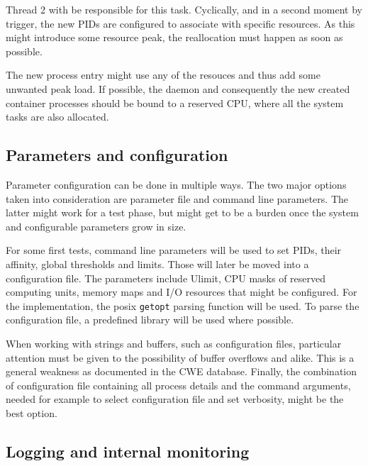 \documentclass[]{scrartcl}
\begin{document}
Thread 2 with be responsible for this task. Cyclically, and in a second moment by trigger, the new PIDs are configured to associate with specific resources.
As this might introduce some resource peak, the reallocation must happen as soon as possible. 

The new process entry might use any of the resouces and thus add some unwanted peak load. 
If possible, the daemon and consequently the new created container processes should be bound to a reserved {CPU}, where all the system tasks are also allocated.

\subsection{Parameters and configuration}

Parameter configuration can be done in multiple ways. The two major options taken into consideration are parameter file and command line parameters.
The latter might work for a test phase, but might get to be a burden once the system and configurable parameters grow in size.

For some first tests, command line parameters will be used to set PIDs, their affinity, global thresholds and limits.
Those will later be moved into a configuration file.
The parameters include Ulimit, CPU masks of reserved computing units, memory maps and I/O resources that might be configured. 
For the implementation, the posix \texttt{getopt} parsing function will be used.
To parse the configuration file, a predefined library will be used where possible.

When working with strings and buffers, such as configuration files, particular attention must be given to the possibility of buffer overflows and alike.
This is a general weakness as documented in the CWE database. %
Finally, the combination of configuration file containing all process details and the command arguments, needed for example to select configuration file and set verbosity, might be the best option.

\subsection{Logging and internal monitoring}
\end{document}
